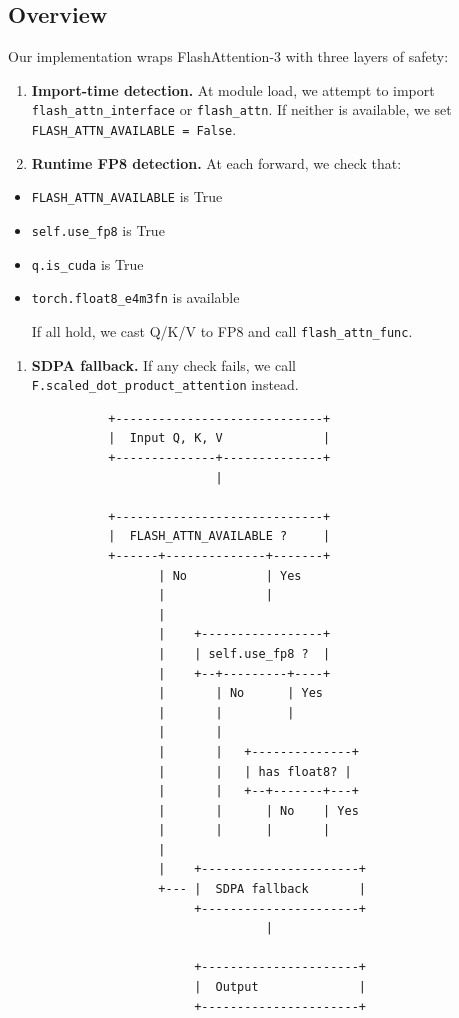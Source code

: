 \subsection{Overview}

Our implementation wraps FlashAttention-3 with three layers of safety:

\begin{enumerate}
\item \textbf{Import-time detection.} At module load, we attempt to import
  \texttt{flash\_attn\_interface} or \texttt{flash\_attn}. If neither is available, we set
  \texttt{FLASH\_ATTN\_AVAILABLE = False}.

\item \textbf{Runtime FP8 detection.} At each forward, we check that:
\end{enumerate}
\begin{itemize}
\item \texttt{FLASH\_ATTN\_AVAILABLE} is True
\item \texttt{self.use\_fp8} is True
\item \texttt{q.is\_cuda} is True
\item \texttt{torch.float8\_e4m3fn} is available
  
  If all hold, we cast Q/K/V to FP8 and call \texttt{flash\_attn\_func}.

\end{itemize}
\begin{enumerate}
\item \textbf{SDPA fallback.} If any check fails, we call
  \texttt{F.scaled\_dot\_product\_attention} instead.

\end{enumerate}
\begin{lstlisting}
              +-----------------------------+
              |  Input Q, K, V              |
              +--------------+--------------+
                             |
                              
              +-----------------------------+
              |  FLASH_ATTN_AVAILABLE ?     |
              +------+--------------+-------+
                     | No           | Yes
                     |              |
                     |               
                     |    +-----------------+
                     |    | self.use_fp8 ?  |
                     |    +--+---------+----+
                     |       | No      | Yes
                     |       |         |
                     |       |          
                     |       |   +--------------+
                     |       |   | has float8? |
                     |       |   +--+-------+---+
                     |       |      | No    | Yes
                     |       |      |       |
                     |                       
                     |    +----------------------+
                     +--- |  SDPA fallback       |
                          +----------------------+
                                    |
                                     
                          +----------------------+
                          |  Output              |
                          +----------------------+
\end{lstlisting}

